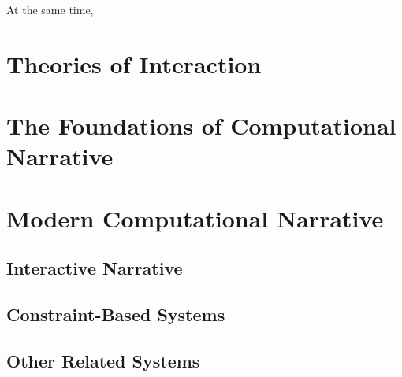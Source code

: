 At the same time, 

\cite{Propp1971}


\section{Theories of Interaction}

\cite{Huizinga1949}
\cite{Bernstein1998}


\section{The Foundations of Computational Narrative}

\cite{Klein1971, Klein1973}
\cite{Meehan1976}
\cite{Lebowitz1984}


\section{Modern Computational Narrative}


\subsection{Interactive Narrative}

\cite{Laurel1986}


\subsection{Constraint-Based Systems}


\subsection{Other Related Systems}


